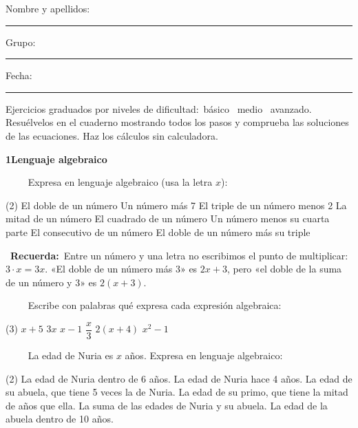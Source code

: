\documentclass[11pt,a4paper]{article}
\newcommand{\estrelles}[1]{{\color{accent}\ifcase#1\or\faStar\faStar[regular]\faStar[regular]\or\faStar\faStar\faStar[regular]\or\faStar\faStar\faStar\fi}}
\newcounter{exer}
\newcommand{\ex}[1]{\par\needspace{4\baselineskip}\medskip\stepcounter{exer}\noindent{\color{navy}\bfseries\theexer.}\ \ {\small\estrelles{#1}}\ \ }
\newcommand{\seccio}[2]{\par\needspace{10\baselineskip}\bigskip
  \begin{tcolorbox}[colback=navy,colframe=navy,coltext=white,arc=2mm,boxrule=0pt,left=3mm,right=3mm,top=1.2mm,bottom=1.2mm]
  {\large\bfseries #1\quad #2}
  \end{tcolorbox}\vspace{-2pt}}
\newcommand{\recorda}[1]{\par\smallskip\begin{tcolorbox}[colback=accent!7,colframe=accent!55,arc=2mm,boxrule=0.5pt,left=2.5mm,right=2.5mm,top=1mm,bottom=1mm]\small{\color{accent}\faLightbulb[regular]}\ \textbf{Recuerda:}\ #1\end{tcolorbox}}
\begin{document}
\thispagestyle{primera}

\vspace{10pt}
Nombre y apellidos: \rule{6.6cm}{0.4pt}\hfill Grupo: \rule{1.6cm}{0.4pt}\hfill Fecha: \rule{2.2cm}{0.4pt}
\vspace{8pt}

\begin{tcolorbox}[colback=soft,colframe=soft,arc=2mm,left=3mm,right=3mm,top=1.5mm,bottom=1.5mm]
\small Ejercicios graduados por niveles de dificultad:\quad \estrelles{1}\ básico \qquad \estrelles{2}\ medio \qquad \estrelles{3}\ avanzado.\\[2pt] Resuélvelos en el cuaderno mostrando todos los pasos y comprueba las soluciones de las ecuaciones. Haz los cálculos sin calculadora.
\end{tcolorbox}

\seccio{1}{Lenguaje algebraico}

\ex{1} Expresa en lenguaje algebraico (usa la letra $x$):\begin{tasks}(2)
  \task El doble de un número
  \task Un número más 7
  \task El triple de un número menos 2
  \task La mitad de un número
  \task El cuadrado de un número
  \task Un número menos su cuarta parte
  \task El consecutivo de un número
  \task El doble de un número más su triple
\end{tasks}\recorda{Entre un número y una letra no escribimos el punto de multiplicar: $3\cdot x=3x$. «El doble de un número más 3» es $2x+3$, pero «el doble de la suma de un número y 3» es $2(x+3)$.}

\ex{1} Escribe con palabras qué expresa cada expresión algebraica:\begin{tasks}(3)
  \task $x+5$
  \task $3x$
  \task $x-1$
  \task $\dfrac{x}{3}$
  \task $2(x+4)$
  \task $x^2-1$
\end{tasks}

\ex{2} La edad de Nuria es $x$ años. Expresa en lenguaje algebraico:\begin{tasks}(2)
  \task La edad de Nuria dentro de 6 años.
  \task La edad de Nuria hace 4 años.
  \task La edad de su abuela, que tiene 5 veces la de Nuria.
  \task La edad de su primo, que tiene la mitad de años que ella.
  \task La suma de las edades de Nuria y su abuela.
  \task La edad de la abuela dentro de 10 años.
\end{tasks}
\end{document}
